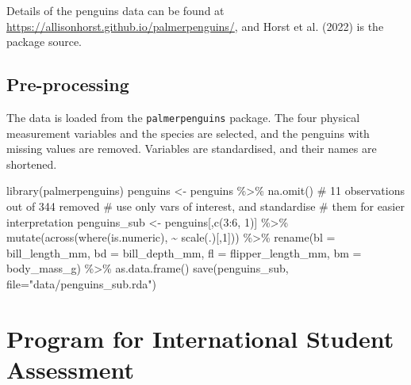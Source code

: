 \documentclass[
  letterpaper,
]{krantz}
\newenvironment{Shaded}{\begin{snugshade}}{\end{snugshade}}
\newcommand{\AttributeTok}[1]{\textcolor[rgb]{0.40,0.45,0.13}{#1}}
\newcommand{\CommentTok}[1]{\textcolor[rgb]{0.37,0.37,0.37}{#1}}
\newcommand{\DecValTok}[1]{\textcolor[rgb]{0.68,0.00,0.00}{#1}}
\newcommand{\FunctionTok}[1]{\textcolor[rgb]{0.28,0.35,0.67}{#1}}
\newcommand{\NormalTok}[1]{\textcolor[rgb]{0.00,0.23,0.31}{#1}}
\newcommand{\OtherTok}[1]{\textcolor[rgb]{0.00,0.23,0.31}{#1}}
\newcommand{\SpecialCharTok}[1]{\textcolor[rgb]{0.37,0.37,0.37}{#1}}
\newcommand{\StringTok}[1]{\textcolor[rgb]{0.13,0.47,0.30}{#1}}
\begin{document}
Details of the penguins data can be found at
\url{https://allisonhorst.github.io/palmerpenguins/}, and Horst et al.
(2022) is the package source.

\subsection*{Pre-processing}\label{pre-processing-3}

The data is loaded from the \texttt{palmerpenguins} package. The four
physical measurement variables and the species are selected, and the
penguins with missing values are removed. Variables are standardised,
and their names are shortened.

\begin{Shaded}
\begin{Highlighting}[]
\FunctionTok{library}\NormalTok{(palmerpenguins)}
\NormalTok{penguins }\OtherTok{\textless{}{-}}\NormalTok{ penguins }\SpecialCharTok{\%\textgreater{}\%}
  \FunctionTok{na.omit}\NormalTok{() }\CommentTok{\# 11 observations out of 344 removed}
\CommentTok{\# use only vars of interest, and standardise}
\CommentTok{\# them for easier interpretation}
\NormalTok{penguins\_sub }\OtherTok{\textless{}{-}}\NormalTok{ penguins[,}\FunctionTok{c}\NormalTok{(}\DecValTok{3}\SpecialCharTok{:}\DecValTok{6}\NormalTok{, }\DecValTok{1}\NormalTok{)] }\SpecialCharTok{\%\textgreater{}\%} 
  \FunctionTok{mutate}\NormalTok{(}\FunctionTok{across}\NormalTok{(}\FunctionTok{where}\NormalTok{(is.numeric),  }\SpecialCharTok{\textasciitilde{}} \FunctionTok{scale}\NormalTok{(.)[,}\DecValTok{1}\NormalTok{])) }\SpecialCharTok{\%\textgreater{}\%}
  \FunctionTok{rename}\NormalTok{(}\AttributeTok{bl =}\NormalTok{ bill\_length\_mm,}
         \AttributeTok{bd =}\NormalTok{ bill\_depth\_mm,}
         \AttributeTok{fl =}\NormalTok{ flipper\_length\_mm,}
         \AttributeTok{bm =}\NormalTok{ body\_mass\_g) }\SpecialCharTok{\%\textgreater{}\%}
  \FunctionTok{as.data.frame}\NormalTok{()}
\FunctionTok{save}\NormalTok{(penguins\_sub, }\AttributeTok{file=}\StringTok{"data/penguins\_sub.rda"}\NormalTok{)}
\end{Highlighting}
\end{Shaded}

\section{Program for International Student
Assessment}\label{program-for-international-student-assessment}
\end{document}
